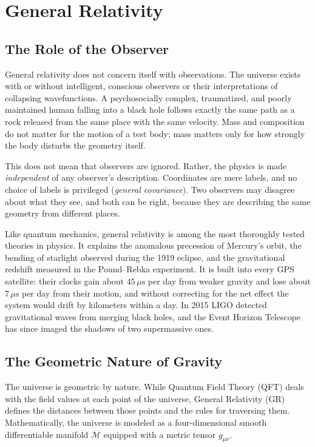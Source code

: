 \chapter{General Relativity}
\label{chap:general-relativity}

\section*{The Role of the Observer}

General relativity does not concern itself with observations.
The universe exists with or without intelligent, conscious observers or their interpretations of collapsing wavefunctions.
A psychosocially complex, traumatized, and poorly maintained human falling into a black hole follows exactly the same path as a rock released from the same place with the same velocity.
Mass and composition do not matter for the motion of a test body; mass matters only for how strongly the body disturbs the geometry itself.

This does not mean that observers are ignored. Rather, the physics is made \emph{independent} of any observer's description.
Coordinates are mere labels, and no choice of labels is privileged (\emph{general covariance}).
Two observers may disagree about what they see, and both can be right, because they are describing the same geometry from different places.

Like quantum mechanics, general relativity is among the most thoroughly tested theories in physics.
It explains the anomalous precession of Mercury's orbit, the bending of starlight observed during the 1919 eclipse, and the gravitational 
redshift measured in the Pound--Rebka experiment.
It is built into every GPS satellite: their clocks gain about $45\,\mu\mathrm{s}$ per day from weaker gravity and lose about $7\,\mu\mathrm{s}$ per day 
from their motion, and without correcting for the net effect the system would drift by kilometers within a day.
In 2015 LIGO detected gravitational waves from merging black holes, and the Event Horizon Telescope has since imaged the shadows of two supermassive ones.


\section*{The Geometric Nature of Gravity}

The universe is geometric by nature.
While Quantum Field Theory (QFT) deals with the field values at each point of the universe, General Relativity (GR) defines the distances between those points and the rules for traversing them.
Mathematically, the universe is modeled as a four-dimensional smooth differentiable manifold $\mathcal{M}$ equipped with a metric tensor $g_{\mu\nu}$.

